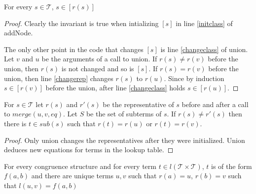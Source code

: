 







\begin{invariant}

For every $s \in \mathcal{T}$, $s \in [r(s)]$
\label{invar:class}
\end{invariant}

\begin{proof}

Clearly the invariant is true when intializing $[s]$ in line \ref{initclass} of addNode.

The only other point in the code that changes $[s]$ is line \ref{changeclass} of union.
Let $v$ and $u$ be the arguments of a call to union.
If $r(s) \neq r(v)$ before the union, then $r(s)$ is not changed and so is $[s]$.
If $r(s) = r(v)$ before the union, then line \ref{changerep} changes $r(s)$ to $r(u)$.
Since by induction $s \in [r(v)]$ before the union, after line \ref{changeclass} holds $s \in [r(u)]$.

\end{proof}

\begin{assertion}

For $s \in \mathcal{T}$ let $r(s)$ and $r'(s)$ be the representative of $s$ before and after a call to $merge(u,v,eq)$.
Let $S$ be the set of subterms of $s$.
If $r(s) \neq r'(s)$ then there is $t \in sub(s)$ such that $r(t) = r(u)$ or $r(t) = r(v)$.

\end{assertion}

\begin{proof}

Only union changes the representatives after they were initialized.
Union deduces new equations for terms in the lookup table.

\end{proof}

\begin{invariant}[Lookup]

For every congruence structure and for every term $t \in l(\mathcal{T}\times \mathcal{T})$, $t$ is of the form $f(a,b)$ and there are unique terms $u,v$ such that $r(a) = u$, $r(b) = v$ such that $l(u,v) = f(a,b)$

\end{invariant}

